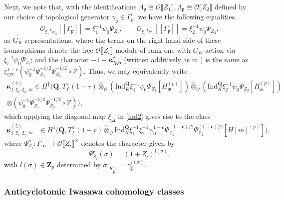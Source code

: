 \documentclass[10pt,letterpaper]{amsart}
\theoremstyle{plain}
\theoremstyle{definition}
\theoremstyle{definition}
\theoremstyle{plain}
\theoremstyle{plain}
\theoremstyle{plain}
\theoremstyle{remark}
\numberwithin{equation}{section}
\newcommand{\cc}{\mathbf{c}}
\newcommand{\pp}{\mathfrak{p}}
\newcommand{\ppbar}{\bar{\mathfrak{p}}}
\newcommand{\fkm}{\mathfrak{m}}
\newcommand{\fkmbar}{\overline{\mathfrak{m}}}
\def\cO{\mathcal O}
\newcommand{\Q}{\mathbf{Q}}
\newcommand{\Z}{\mathbf{Z}}
\newcommand{\dBr}[1]{\llbracket{#1}\rrbracket}
\newcommand{\bfg}{{\boldsymbol{g}}}
\newcommand{\bfh}{{\boldsymbol{h}}}
\begin{document}
Next, we note that, with the identifications $\Lambda_\pp\cong\cO\dBr{Z_1}, \Lambda_\pp\cong\cO\dBr{Z_2}$ defined by our choice of topological generator $\gamma_\pp\in\Gamma_\pp$, we have the following equalities 
\[
\cO_{\xi_1^{-1}\psi_0}[\![\Gamma_\pp]\!]=\xi_1^{-1}\psi_0\Psi_{Z_1},\quad\quad\cO_{\xi_2^{-1}\psi_0}[\![\Gamma_\pp]\!]=\xi_2^{-1}\psi_0\Psi_{Z_2},
\]
as $G_K$-representations, where the terms on the right-hand side of these isomorphisms denote the free $\cO\dBr{Z_i}$-module of rank one with $G_K$-action via $\xi_i^{-1}\psi_0\Psi_{Z_i}$; and the  character $-1-\boldsymbol{\kappa}_{f\bfg\bfh}^*$ (written additively as in \cite[\S{8.1}]{BSV}) is the same as $\varepsilon_{\mathrm{cyc}}^{1-r}(\psi_0^{-1}\Psi_{Z_1}^{-1/2}\Psi_{Z_2}^{-1/2}\circ\mathscr{V})$. Thus, we may equivalently write
\begin{equation}\label{eq:big-4}
\begin{aligned}
    \boldsymbol{\kappa}_{f,\xi_1,\xi_2,m}^{(4)}\in H^1\bigl(\Q,T_f^\vee(1-r)\hat\otimes_{\cO}({\mathrm{Ind}}_K^\Q\xi_1^{-1}\psi_0\Psi_{Z_1}[H_{\fkm}^{(p)}])\hat\otimes_{\cO}({\mathrm{Ind}}_K^\Q\xi_2^{-1}\psi_0\Psi_{Z_2}[H_{\fkmbar}^{(p)}])\\ \otimes(\psi_0^{-1}\Psi_{Z_1}^{-1/2}\Psi_{Z_2}^{-1/2}\circ\mathscr{V})\bigr),
\end{aligned}
\end{equation}
which applying the diagonal map $\xi_\Delta$ in \eqref{ind2}  gives rise to the class
\begin{equation}\label{eq:big-5}
\begin{aligned}
\boldsymbol{\kappa}_{f,\xi_1,\xi_2,m}^{(5)}&\in 
H^1\bigl(\Q,T_f^\vee(1-r)\hat\otimes_\cO{\mathrm{Ind}}_{K}^\Q\xi_1^{-1}\xi_2^{-1}\psi_0^{1-\cc}\Psi_{Z_1}^{(1-\cc)/2}\Psi_{Z_2}^{(1-\cc)/2}[H[m]^{(p)}]\bigr),
\end{aligned}
\end{equation}
where $\Psi_{Z_i}^\cc:\Gamma_\infty\rightarrow\cO\dBr{Z_i}^\times$ denotes the character given by
\[
\Psi_{Z_i}^\cc(\sigma)=(1+Z_i)^{l(\sigma)},
\]
with $l(\sigma)\in\Z_p$ determined by   $\sigma\vert_{K^\circ_{\ppbar^\infty}}=\gamma_{\ppbar}^{l(\sigma)}$.


\subsubsection{Anticyclotomic Iwasawa cohomology classes} 
\label{subsubsec:Iw-classes}
\end{document}
